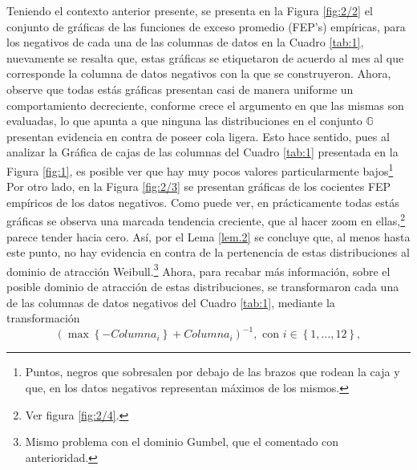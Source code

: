 \documentclass[10.5pt,notitlepage]{article}
\newcommand{\GG}{\mathbb{G}}
\newcommand{\kis}[1]{\left\{ #1 \right\}}
\theoremstyle{plain}
\begin{document}
Teniendo el contexto anterior presente, se presenta en la Figura \ref{fig:2/2} el conjunto de gráficas de las funciones de exceso promedio (FEP's) empíricas, para los negativos de cada una de las columnas de datos en la Cuadro \ref{tab:1}, nuevamente se resalta que, estas gráficas se etiquetaron de acuerdo al mes al que corresponde la columna de datos negativos con la que se construyeron. Ahora, observe que todas estás gráficas presentan casi de manera uniforme un comportamiento decreciente, conforme crece el argumento en que las mismas son evaluadas, lo que apunta a que ninguna las distribuciones en el conjunto \(\GG\) presentan evidencia en contra de poseer cola ligera. Esto hace sentido, pues al analizar la Gráfica de cajas de las columnas del Cuadro \ref{tab:1} presentada en la Figura \ref{fig:1}, es posible ver que hay muy pocos valores particularmente bajos\footnote{Puntos, negros que sobresalen por debajo de las brazos que rodean la caja y que, en los datos negativos representan máximos de los mismos.} Por otro lado, en la Figura \ref{fig:2/3} se presentan gráficas de los cocientes FEP empíricos de los datos negativos. Como puede ver, en prácticamente todas estás gráficas se observa una marcada tendencia creciente, que al hacer zoom en ellas,\footnote{Ver figura \ref{fig:2/4}.} parece tender hacia cero. Así, por el Lema \ref{lem.2} se concluye que, al menos hasta este punto, no hay evidencia en contra de la pertenencia de estas distribuciones al dominio de atracción Weibull.\footnote{Mismo problema con el dominio Gumbel, que el comentado con anterioridad.} Ahora, para recabar más información, sobre el posible dominio de atracción de estas distribuciones, se transformaron cada una de las columnas de datos negativos del Cuadro \ref{tab:1}, mediante la transformación
\begin{equation}\label{lab.1}
    (\max\kis{-Columna_i} + Columna_{i})^{-1}, \text{ con } i \in \kis{1, \hdots, 12},
\end{equation}
\end{document}
